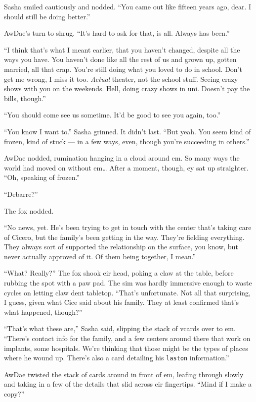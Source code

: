 Sasha smiled cautiously and nodded. ``You came out like fifteen years ago, dear. I should still be doing better.''

AwDae's turn to shrug. ``It's hard to ask for that, is all. Always has been.''

``I think that's what I meant earlier, that you haven't changed, despite all the ways you have. You haven't done like all the rest of us and grown up, gotten married, all that crap. You're still doing what you loved to do in school. Don't get me wrong, I miss it too. \emph{Actual} theater, not the school stuff. Seeing crazy shows with you on the weekends. Hell, doing crazy shows in uni. Doesn't pay the bills, though.''

``You should come see us sometime. It'd be good to see you again, too.''

``You know I want to.'' Sasha grinned. It didn't last. ``But yeah. You seem kind of frozen, kind of stuck --- in a few ways, even, though you're succeeding in others.''

AwDae nodded, rumination hanging in a cloud around em. So many ways the world had moved on without em\ldots{} After a moment, though, ey sat up straighter. ``Oh, speaking of frozen.''

``Debarre?''

The fox nodded.

``No news, yet. He's been trying to get in touch with the center that's taking care of Cicero, but the family's been getting in the way. They're fielding everything. They always sort of supported the relationship on the surface, you know, but never actually approved of it. Of them being together, I mean.''

``What? Really?'' The fox shook eir head, poking a claw at the table, before rubbing the spot with a paw pad. The sim was hardly immersive enough to waste cycles on letting claw dent tabletop. ``That's unfortunate. Not all that surprising, I guess, given what Cice said about his family. They at least confirmed that's what happened, though?''

``That's what these are,'' Sasha said, slipping the stack of vcards over to em. ``There's contact info for the family, and a few centers around there that work on implants, some hospitals. We're thinking that those might be the types of places where he wound up. There's also a card detailing his \texttt{laston} information.''

AwDae twisted the stack of cards around in front of em, leafing through slowly and taking in a few of the details that slid across eir fingertips. ``Mind if I make a copy?''

